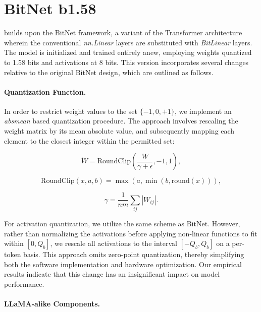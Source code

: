 \section{BitNet b1.58}

 builds upon the BitNet framework, a variant of the Transformer architecture wherein the conventional \emph{nn.Linear} layers are substituted with \emph{BitLinear} layers. The model is initialized and trained entirely anew, employing weights quantized to 1.58 bits and activations at 8 bits. This version incorporates several changes relative to the original BitNet design, which are outlined as follows.

\paragraph{Quantization Function.} In order to restrict weight values to the set $\{-1, 0, +1\}$, we implement an \emph{absmean} based quantization procedure. The approach involves rescaling the weight matrix by its mean absolute value, and subsequently mapping each element to the closest integer within the permitted set:

\begin{equation}
    \widetilde{W} = \mathrm{RoundClip}(\frac{W}{\gamma + \epsilon}, -1, 1),
\end{equation}

\begin{equation}
    \mathrm{RoundClip}(x, a, b) = \max(a, \min(b, \mathrm{round}(x))),
\end{equation}

\begin{equation}
    \gamma = \frac{1}{nm}\sum_{ij} |W_{ij}|.
\end{equation}

For activation quantization, we utilize the same scheme as BitNet. However, rather than normalizing the activations before applying non-linear functions to fit within $[0, Q_b]$, we rescale all activations to the interval $[-Q_b, Q_b]$ on a per-token basis. This approach omits zero-point quantization, thereby simplifying both the software implementation and hardware optimization. Our empirical results indicate that this change has an insignificant impact on model performance.

\paragraph{LLaMA-alike Components.}

